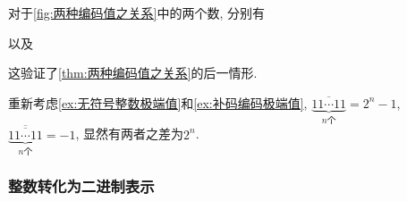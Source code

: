 \documentclass{ctexart}
\begin{document}
\begin{sample}
    \begin{ex}
        对于\cref{fig:两种编码值之关系}中的两个数, 分别有\\
        \centerline{
        }
        以及\\
        \centerline{
        }
        这验证了\cref{thm:两种编码值之关系}的后一情形.
    \end{ex}
\end{sample}
\begin{sample}
    \begin{ex}
        重新考虑\cref{ex:无符号整数极端值}和\cref{ex:补码编码极端值}, $\displaystyle \underbrace{\overline{11\cdots 11}}_{n\text{个}} = 2^n - 1$, $\displaystyle \underbrace{\overline{\overline{11\cdots 11}}}_{n\text{个}} = -1$, 显然有两者之差为$2^n$.
    \end{ex}
\end{sample}


\subsubsection{整数转化为二进制表示} %
\label{ssub:整数转化为二进制表示}
\end{document}
